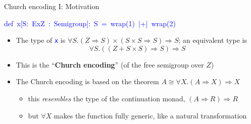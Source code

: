 \documentclass[english,,russian]{beamer}
\newenvironment{lyxcode}
  {\par\begin{list}{}{
    \setlength{\rightmargin}{\leftmargin}
    \setlength{\listparindent}{0pt}%
    \raggedright
    \setlength{\itemsep}{0pt}
    \setlength{\parsep}{0pt}
    \normalfont\ttfamily}%
   \def\{{\char`\{}
   \def\}{\char`\}}
   \def\textasciitilde{\char`\~}
   \item[]}
  {\end{list}}
\begin{document}
\begin{frame}{Church encoding I: Motivation}
\begin{lyxcode}
\textcolor{blue}{\footnotesize{}def~x{[}S:~ExZ~:~Semigroup{]}:~S~=~wrap(1)~|+|~wrap(2)}{\footnotesize\par}
\end{lyxcode}
\begin{itemize}
\item The type of \texttt{\textcolor{blue}{\footnotesize{}x}} is {\footnotesize{}$\forall S.\left(Z\Rightarrow S\right)\times\left(S\times S\Rightarrow S\right)\Rightarrow S$};
an equivalent type is{\footnotesize{}
\[
\forall S.\left(\left(Z+S\times S\right)\Rightarrow S\right)\Rightarrow S
\]
}{\footnotesize\par}
\item {\footnotesize{}\vspace{-0.1cm}}This is the ``\textbf{Church encoding}''
(of the free semigroup over $Z$)
\item The Church encoding is based on the theorem {\footnotesize{}$A\cong\forall X.\left(A\Rightarrow X\right)\Rightarrow X$}{\footnotesize\par}
\begin{itemize}
\item this \emph{resembles} the type of the continuation monad, $\left(A\Rightarrow R\right)\Rightarrow R$
\item but $\forall X$ makes the function fully generic, like a natural
transformation
\end{itemize}
\end{itemize}
\end{frame}
\end{document}

